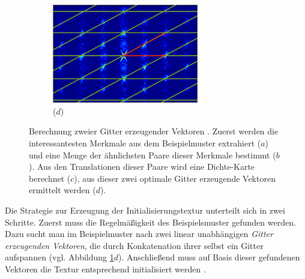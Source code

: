 \begin{figure}
	\hfill
	\begin{subfigure}{0.45\textwidth}
		\centering
		\includegraphics[width=0.7\textwidth]{images/regular-4}
		\caption*{($d$)}
	\end{subfigure}
	
	\caption{
		Berechnung zweier Gitter erzeugender Vektoren \cite{SelfTuning}.
		Zuerst werden die interessantesten Merkmale aus dem Beispielmuster extrahiert ($a$) und eine Menge der ähnlichsten Paare dieser Merkmale bestimmt ($b$).
		Aus den Translationen dieser Paare wird eine Dichte-Karte berechnet ($c$), aus dieser zwei optimale Gitter erzeugende Vektoren ermittelt werden ($d$).
	}
	\label{regular}
\end{figure}

Die Strategie zur Erzeugung der Initialisierungstextur unterteilt sich in zwei Schritte.
Zuerst muss die Regelmäßigkeit des Beispielsmuster gefunden werden.
Dazu sucht man im Beispielmuster nach zwei linear unabhängigen \emph{Gitter erzeugenden Vektoren}, die durch Konkatenation ihrer selbst ein Gitter aufspannen (vgl. Abbildung \ref{regular}$d$).
Anschließend muss auf Basis dieser gefundenen Vektoren die Textur entsprechend initialisiert werden \cite{SelfTuning}.

